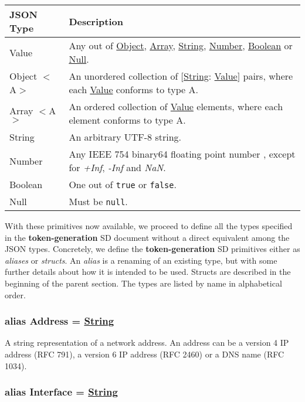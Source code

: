 \documentclass[a4paper]{arrowhead}
\newcommand{\pdef}[1]{{\textcolor{ArrowheadGrey}{#1 \label{sec:model:primitives:#1} \label{sec:model:primitives:#1s}}}}
\newcommand{\pref}[1]{{\textcolor{ArrowheadGrey}{\hyperref[sec:model:primitives:#1]{#1}}}}
\begin{document}
\begin{table}[ht!]
\begin{tabularx}{\textwidth}{| p{3cm} | X |} \hline
\rowcolor{gray!33} JSON Type & Description \\ \hline
\pdef{Value}                 & Any out of \pref{Object}, \pref{Array}, \pref{String}, \pref{Number}, \pref{Boolean} or \pref{Null}. \\ \hline
\pdef{Object}$<$A$>$         & An unordered collection of $[$\pref{String}: \pref{Value}$]$ pairs, where each \pref{Value} conforms to type A. \\ \hline
\pdef{Array}$<$A$>$          & An ordered collection of \pref{Value} elements, where each element conforms to type A. \\ \hline
\pdef{String}                & An arbitrary UTF-8 string. \\ \hline
\pdef{Number}                & Any IEEE 754 binary64 floating point number \cite{cowlishaw2019floating}, except for \textit{+Inf}, \textit{-Inf} and \textit{NaN}. \\ \hline
\pdef{Boolean}               & One out of \texttt{true} or \texttt{false}. \\ \hline
\pdef{Null}                  & Must be \texttt{null}. \\ \hline
\end{tabularx}
\end{table}

With these primitives now available, we proceed to define all the types specified in the \textbf{token-generation} SD document without a direct equivalent among the JSON types.
Concretely, we define the \textbf{token-generation} SD primitives either as \textit{aliases} or \textit{structs}.
An \textit{alias} is a renaming of an existing type, but with some further details about how it is intended to be used.
Structs are described in the beginning of the parent section.
The types are listed by name in alphabetical order.

\subsubsection{alias \pdef{Address} = \pref{String}}

A string representation of a network address. An address can be a version 4 IP address (RFC 791), a version 6 IP address (RFC 2460) or a DNS name (RFC 1034).

\subsubsection{alias \pdef{Interface} = \pref{String}}
\end{document}
